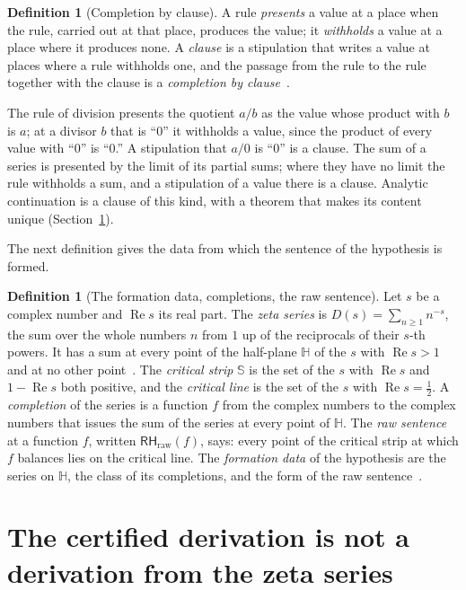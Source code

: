 \documentclass[11pt]{article}
\theoremstyle{definition}
\newtheorem{definition}[theorem]{Definition}
\theoremstyle{remark}
\newcommand{\re}{\operatorname{Re}}
\newcommand{\RHraw}{\mathsf{RH}_{\mathrm{raw}}}
\newcommand{\Hp}{\mathbb H}
\newcommand{\St}{\mathbb S}
\begin{document}
\begin{definition}[Completion by clause]\label{def:clause}
A rule \emph{presents} a value at a place when the rule, carried out at that place, produces the value; it \emph{withholds} a value at a place where it produces none. A \emph{clause} is a stipulation that writes a value at places where a rule withholds one, and the passage from the rule to the rule together with the clause is a \emph{completion by clause}~\citep{tv}.
\end{definition}

\noindent The rule of division presents the quotient $a/b$ as the value whose product with $b$ is $a$; at a divisor $b$ that is ``0'' it withholds a value, since the product of every value with ``0'' is ``0.'' A stipulation that $a/0$ is ``0'' is a clause. The sum of a series is presented by the limit of its partial sums; where they have no limit the rule withholds a sum, and a stipulation of a value there is a clause. Analytic continuation is a clause of this kind, with a theorem that makes its content unique (Section~\ref{sec:between}).

\noindent The next definition gives the data from which the sentence of the hypothesis is formed.

\begin{definition}[The formation data, completions, the raw sentence]\label{def:formation}
Let $s$ be a complex number and $\re s$ its real part. The \emph{zeta series} is $D(s)=\sum_{n\ge1}n^{-s}$, the sum over the whole numbers $n$ from $1$ up of the reciprocals of their $s$-th powers. It has a sum at every point of the half-plane $\Hp$ of the $s$ with $\re s>1$ and at no other point~\citep[ch.~II]{hardyriesz}. The \emph{critical strip} $\St$ is the set of the $s$ with $\re s$ and $1-\re s$ both positive, and the \emph{critical line} is the set of the $s$ with $\re s=\tfrac12$. A \emph{completion} of the series is a function $f$ from the complex numbers to the complex numbers that issues the sum of the series at every point of $\Hp$. The \emph{raw sentence} at a function $f$, written $\RHraw(f)$, says: every point of the critical strip at which $f$ balances lies on the critical line. The \emph{formation data} of the hypothesis are the series on $\Hp$, the class of its completions, and the form of the raw sentence~\citep{tv}.
\end{definition}

\section{The certified derivation is not a derivation from the zeta series}\label{sec:between}
\end{document}
